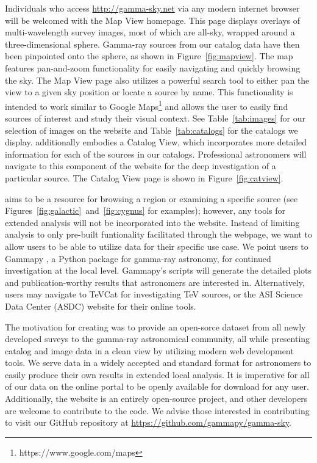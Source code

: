 Individuals who access \url{http://gamma-sky.net} via any modern internet browser will be welcomed with the Map View homepage. This page displays overlays of multi-wavelength survey images, most of which are all-sky, wrapped around a three-dimensional sphere. Gamma-ray sources from our catalog data have then been pinpointed onto the sphere, as shown in Figure~\ref{fig:mapview}. The map features pan-and-zoom functionality for easily navigating and quickly browsing the sky. The Map View page also utilizes a powerful search tool to either pan the view to a given sky position or locate a source by name. This functionality is intended to work similar to Google Maps\footnote[1]{https://www.google.com/maps} and allows the user to easily find sources of interest and study their visual context. See Table~\ref{tab:images} for our selection of images on the website and Table~\ref{tab:catalogs} for the catalogs we display. \gammasky additionally embodies a Catalog View, which incorporates more detailed information for each of the sources in our catalogs. Professional astronomers will navigate to this component of the website for the deep investigation of a particular source. The Catalog View page is shown in Figure~\ref{fig:catview}.





\gammasky aims to be a resource for browsing a region or examining a specific source (see Figures~\ref{fig:galactic}~and~\ref{fig:cygnus} for examples); however, any tools for extended analysis will not be incorporated into the website. Instead of limiting analysis to only pre-built funtionality facilitated through the webpage, we want to allow users to be able to utilize data for their specific use case. We point users to Gammapy \cite{gammapy}, a Python package for gamma-ray astronomy, for continued investigation at the local level. Gammapy's scripts will generate the detailed plots and publication-worthy results that astronomers are interested in. Alternatively, users may navigate to TeVCat \cite{tevcat} for investigating TeV sources, or the ASI Science Data Center (ASDC) website for their online tools. 


The motivation for creating \gammasky was to provide an open-sorce dataset from all newly developed suveys to the gamma-ray astronomical community, all while presenting catalog and image data in a clean view by utilizing modern web development tools. We serve data in a widely accepted and standard format for astronomers to easily produce their own results in extended local analysis. It is imperative for all of our data on the online portal to be openly available for download for any user. Additionally, the website is an entirely open-source project, and other developers are welcome to contribute to the code. We advise those interested in contributing to visit our GitHub repository at \url{https://github.com/gammapy/gamma-sky}.
